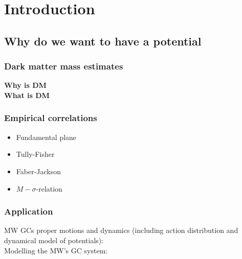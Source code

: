 \section{Introduction}

\subsection{Why do we want to have a potential}
\subsubsection{Dark matter mass estimates}
\textbf{Why is DM}\\
\textbf{What is DM}
\subsubsection{Empirical correlations}
\begin{itemize}
    \item Fundamental plane
    \item Tully-Fisher
    \item Faber-Jackson
    \item $M-\sigma$-relation
\end{itemize}
\subsubsection{Application}
MW \acp{GC} proper motions and dynamics (including action distribution and dynamical model of potentials): \cite{Vasiliev...GCdynsGaiaDR2...2018}\\
Modelling the \ac{MW}'s \ac{GC} system: \cite{Binney...GCsystem...2017}



